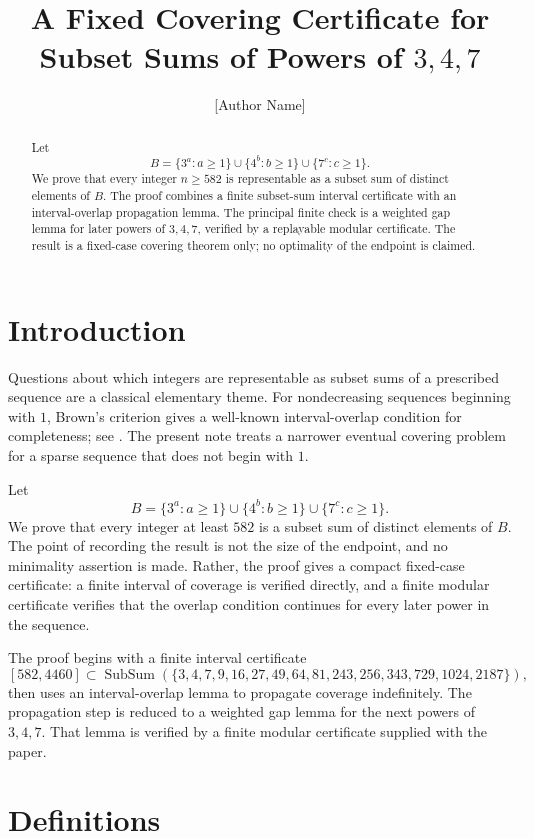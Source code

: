 \documentclass[11pt]{article}
\title{A Fixed Covering Certificate for Subset Sums of Powers of \(3,4,7\)}
\author{[Author Name]}
\date{}
\DeclareMathOperator{\SubSum}{SubSum}
\begin{document}
\maketitle

\begin{abstract}
Let
\[
B=\{3^a:a\ge1\}\cup\{4^b:b\ge1\}\cup\{7^c:c\ge1\}.
\]
We prove that every integer \(n\ge582\) is representable as a subset sum of distinct
elements of \(B\). The proof combines a finite subset-sum interval certificate with
an interval-overlap propagation lemma. The principal finite check is a weighted
gap lemma for later powers of \(3,4,7\), verified by a replayable modular certificate.
The result is a fixed-case covering theorem only; no optimality of the endpoint is
claimed.
\end{abstract}

\section{Introduction}

Questions about which integers are representable as subset sums of a prescribed
sequence are a classical elementary theme.  For nondecreasing sequences beginning
with \(1\), Brown's criterion gives a well-known interval-overlap condition for
completeness; see \cite{brown1961}.  The present note treats a narrower eventual
covering problem for a sparse sequence that does not begin with \(1\).

Let
\[
B=\{3^a:a\ge1\}\cup\{4^b:b\ge1\}\cup\{7^c:c\ge1\}.
\]
We prove that every integer at least \(582\) is a subset sum of distinct elements of
\(B\).  The point of recording the result is not the size of the endpoint, and no
minimality assertion is made.  Rather, the proof gives a compact fixed-case
certificate: a finite interval of coverage is verified directly, and a finite
modular certificate verifies that the overlap condition continues for every later
power in the sequence.

The proof begins with a finite interval certificate
\[
[582,4460]\subset \SubSum(\{3,4,7,9,16,27,49,64,81,243,256,343,729,1024,2187\}),
\]
then uses an interval-overlap lemma to propagate coverage indefinitely.  The
propagation step is reduced to a weighted gap lemma for the next powers of
\(3,4,7\).  That lemma is verified by a finite modular certificate supplied with the
paper.

\section{Definitions}
\end{document}
